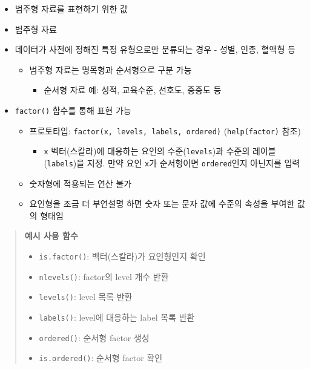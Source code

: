 \documentclass[11pt,a4paper]{book}
\providecommand{\tightlist}{%
  \setlength{\itemsep}{0pt}\setlength{\parskip}{0pt}}
\theoremstyle{definition}
\theoremstyle{definition}
\theoremstyle{definition}
\theoremstyle{remark}
\begin{document}
\begin{itemize}
\tightlist
\item
  범주형 자료를 표현하기 위한 값
\item
  범주형 자료
\item
  데이터가 사전에 정해진 특정 유형으로만 분류되는 경우 - 성별, 인종,
  혈액형 등

  \begin{itemize}
  \tightlist
  \item
    범주형 자료는 명목형과 순서형으로 구분 가능

    \begin{itemize}
    \tightlist
    \item
      순서형 자료 예: 성적, 교육수준, 선호도, 중증도 등
    \end{itemize}
  \end{itemize}
\item
  \texttt{factor()} 함수를 통해 표현 가능

  \begin{itemize}
  \tightlist
  \item
    프로토타입: \texttt{factor(x,\ levels,\ labels,\ ordered)}
    (\texttt{help(factor)} 참조)

    \begin{itemize}
    \tightlist
    \item
      \texttt{x} 벡터(스칼라)에 대응하는 요인의 수준(\texttt{levels})과
      수준의 레이블(\texttt{labels})을 지정. 만약 요인 \texttt{x}가
      순서형이면 \texttt{ordered}인지 아닌지를 입력
    \end{itemize}
  \item
    숫자형에 적용되는 연산 불가
  \item
    요인형을 조금 더 부연설명 하면 숫자 또는 문자 값에 수준의 속성을
    부여한 값의 형태임
  \end{itemize}
\end{itemize}

\begin{quote}
\colorbox{gray!10}{\begin{minipage}{15cm}
\textbf{예시 사용 함수}
\begin{itemize}
  \item \texttt{is.factor()}: 벡터(스칼라)가 요인형인지 확인
  \item \texttt{nlevels()}: factor의 level 개수 반환
  \item \texttt{levels()}: level 목록 반환
  \item \texttt{labels()}: level에 대응하는 label 목록 반환
  \item \texttt{ordered()}: 순서형 factor 생성
  \item \texttt{is.ordered()}: 순서형 factor 확인
\end{itemize}
\end{minipage}}
\end{quote}
\end{document}
